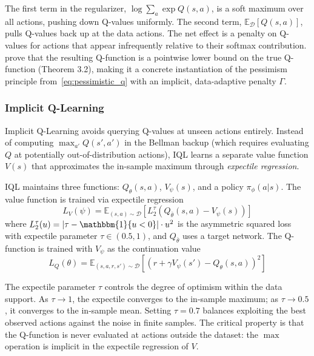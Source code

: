The first term in the regularizer, $\log \sum_a \exp Q(s,a)$, is a soft maximum over all actions, pushing down Q-values uniformly. The second term, $\mathbb{E}_{\mathcal{D}}[Q(s,a)]$, pulls Q-values back up at the data actions. The net effect is a penalty on Q-values for actions that appear infrequently relative to their softmax contribution. \citet{Kumar2020} prove that the resulting Q-function is a pointwise lower bound on the true Q-function (Theorem 3.2), making it a concrete instantiation of the pessimism principle from~\eqref{eq:pessimistic_q} with an implicit, data-adaptive penalty $\Gamma$.

\subsubsection{Implicit Q-Learning}

Implicit Q-Learning \citep[IQL,][]{Kostrikov2022} avoids querying Q-values at unseen actions entirely. Instead of computing $\max_{a'} Q(s', a')$ in the Bellman backup (which requires evaluating $Q$ at potentially out-of-distribution actions), IQL learns a separate value function $V(s)$ that approximates the in-sample maximum through \textit{expectile regression}.

\begin{definition}
\label{def:iql}
IQL maintains three functions: $Q_\theta(s,a)$, $V_\psi(s)$, and a policy $\pi_\phi(a|s)$. The value function is trained via expectile regression
\begin{equation}
\label{eq:iql_v}
L_V(\psi) = \mathbb{E}_{(s,a) \sim \mathcal{D}}\left[L_2^\tau(Q_{\bar{\theta}}(s,a) - V_\psi(s))\right]
\end{equation}
where $L_2^\tau(u) = |\tau - \mathbbm{1}\{u < 0\}| \cdot u^2$ is the asymmetric squared loss with expectile parameter $\tau \in (0.5, 1)$, and $Q_{\bar{\theta}}$ uses a target network. The Q-function is trained with $V_\psi$ as the continuation value
\begin{equation}
\label{eq:iql_q}
L_Q(\theta) = \mathbb{E}_{(s,a,r,s') \sim \mathcal{D}}\left[(r + \gamma V_\psi(s') - Q_\theta(s,a))^2\right]
\end{equation}
\end{definition}

The expectile parameter $\tau$ controls the degree of optimism within the data support. As $\tau \to 1$, the expectile converges to the in-sample maximum; as $\tau \to 0.5$, it converges to the in-sample mean. Setting $\tau = 0.7$ balances exploiting the best observed actions against the noise in finite samples. The critical property is that the Q-function is never evaluated at actions outside the dataset: the $\max$ operation is implicit in the expectile regression of $V$.

